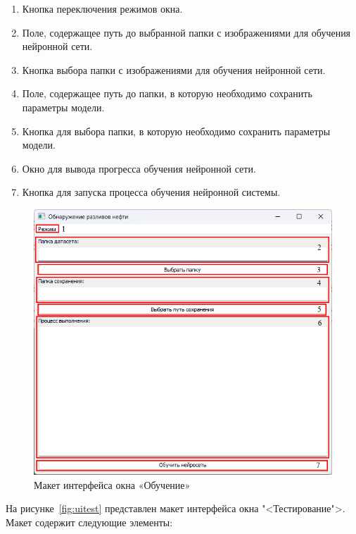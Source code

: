 \begin{enumerate}
	\item Кнопка переключения режимов окна.
	\item Поле, содержащее путь до выбранной папки с изображениями для обучения нейронной сети.
	\item Кнопка выбора папки с изображениями для обучения нейронной сети.
	\item Поле, содержащее путь до папки, в которую необходимо сохранить параметры модели.
	\item Кнопка для выбора папки, в которую необходимо сохранить параметры модели.
	\item Окно для вывода прогресса обучения нейронной сети.
	\item Кнопка для запуска процесса обучения нейронной системы.
\end{enumerate}

\begin{figure}[H]
	\centering
	\includegraphics[width=1\linewidth]{images/ui_train}
	\caption{Макет интерфейса окна «Обучение»}
	\label{fig:uitrain}
\end{figure}

На рисунке~\ref{fig:uitest} представлен макет интерфейса окна "<Тестирование">. Макет содержит следующие элементы:


